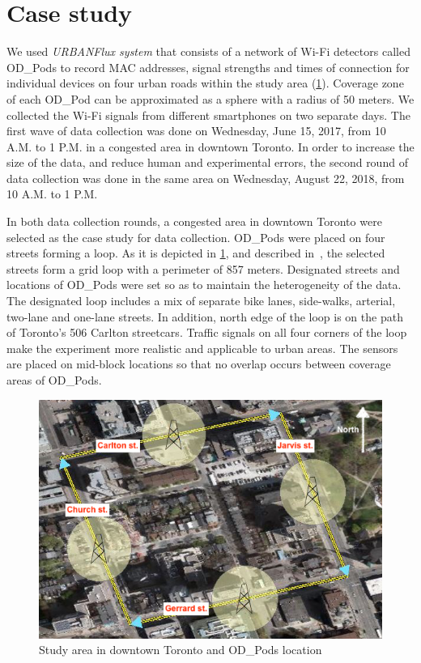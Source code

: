 \section{Case study}
\label{S:w4}
We used \textit{URBANFlux system} that consists of a network of Wi-Fi detectors called OD\_Pods \cite{farooq2015ubiquitous} to record MAC addresses, signal strengths and times of connection for individual devices on four urban roads within the study area (\cref{fig:odloc}). Coverage zone of each OD\_Pod can be approximated as a sphere with a radius of 50 meters. We collected the Wi-Fi signals from different smartphones on two separate days. The first wave of data collection was done on Wednesday, June 15, 2017, from 10 A.M. to 1 P.M. in a congested area in downtown Toronto. In order to increase the size of the data, and reduce human and experimental errors, the second round of data collection was done in the same area on Wednesday, August 22, 2018, from 10 A.M. to 1 P.M.

In both data collection rounds, a congested area in downtown Toronto were selected as the case study for data collection. OD\_Pods were placed on four streets forming a loop. As it is depicted in \cref{fig:odloc}, and described in~\cite{kalatian2018mobility}, the selected streets form a grid loop with a perimeter of 857 meters. Designated streets and locations of OD\_Pods were set so as to maintain the heterogeneity of the data. The designated loop includes a mix of separate bike lanes, side-walks, arterial, two-lane and one-lane streets. In addition, north edge of the loop is on the path of Toronto's 506 Carlton streetcars. Traffic signals on all four corners of the loop make the experiment more realistic and applicable to urban areas. The sensors are placed on mid-block locations so that no overlap occurs between coverage areas of OD\_Pods.

\begin{figure}
\centering
\includegraphics[scale=0.425]{chapter_2/figures/odpods.png}
\caption{Study area in downtown Toronto and OD\_Pods location}
\label{fig:odloc}
\end{figure}

